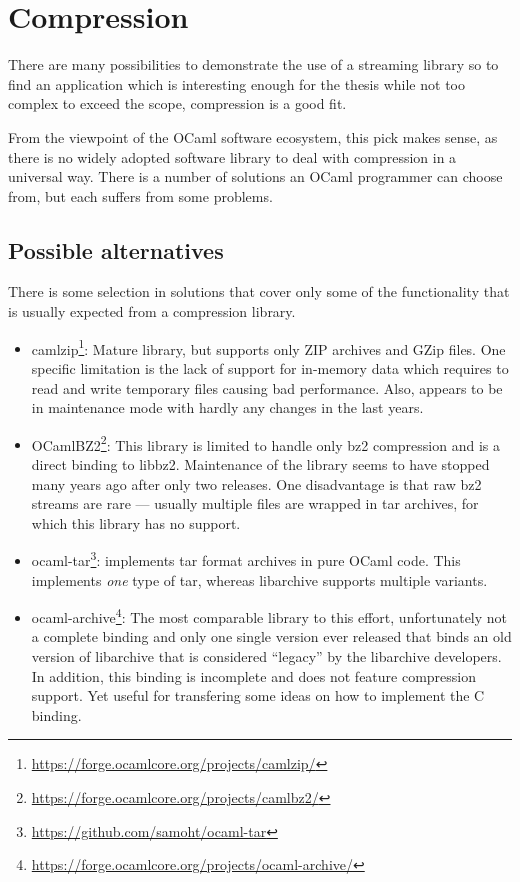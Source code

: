 \documentclass[parskip=half]{scrreprt}
\begin{document}
\section{Compression}
\label{sec:compression}

There are many possibilities to demonstrate the use of a streaming library so
to find an application which is interesting enough for the thesis while not too
complex to exceed the scope, compression is a good fit.

From the viewpoint of the OCaml software ecosystem, this pick makes sense, as
there is no widely adopted software library to deal with compression in a
universal way. There is a number of solutions an OCaml programmer can choose
from, but each suffers from some problems.

\subsection{Possible alternatives}
\label{sec:alternatives}

There is some selection in solutions that cover only some of the functionality
that is usually expected from a compression library.

\begin{itemize}
  \item camlzip\footnote{\url{https://forge.ocamlcore.org/projects/camlzip/}}:
    Mature library, but supports only ZIP archives and GZip files. One specific
    limitation is
    the lack of support for in-memory data which requires to read and write
    temporary files causing bad performance. Also, appears to be in maintenance
    mode with hardly any changes in the last years.
  \item OCamlBZ2\footnote{\url{https://forge.ocamlcore.org/projects/camlbz2/}}:
    This library is limited to handle only bz2 compression and is a direct
    binding to libbz2. Maintenance of the library seems to have stopped many
    years ago after only two releases. One disadvantage is that raw bz2
    streams are rare — usually multiple files are wrapped in tar archives,
    for which this library has no support.
  \item ocaml-tar\footnote{\url{https://github.com/samoht/ocaml-tar}}:
    implements tar format archives in pure OCaml code. This implements
    \emph{one} type of tar, whereas libarchive supports multiple variants.
  \item ocaml-archive\footnote{\url{https://forge.ocamlcore.org/projects/ocaml-archive/}}:
    The most comparable library to this effort, unfortunately not a complete
    binding and only one single version ever released that binds an old version
    of libarchive that is considered \enquote{legacy} by the libarchive
    developers. In addition, this binding is incomplete and does not feature
    compression support. Yet useful for transfering some ideas on how to
    implement the C binding.
\end{itemize}
\end{document}
